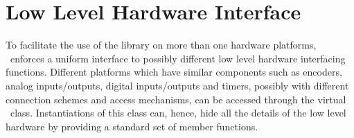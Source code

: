 %
%
% 
% 
% 
% 
% 

%
%

\chapter{Low Level Hardware Interface}
\label{sec:hardware_interface}

To facilitate the use of the library on more than one hardware platforms,
\rhexlib\ enforces a uniform interface to possibly different low level
hardware interfacing functions. Different platforms which have similar
components such as encoders, analog inputs/outputs, digital inputs/outputs
and timers, possibly with different connection schemes and access
mechanisms, can be accessed through the virtual \Hardware\
class. Instantiations of this class can, hence, hide all the details of the
low level hardware by providing a standard set of member functions.

